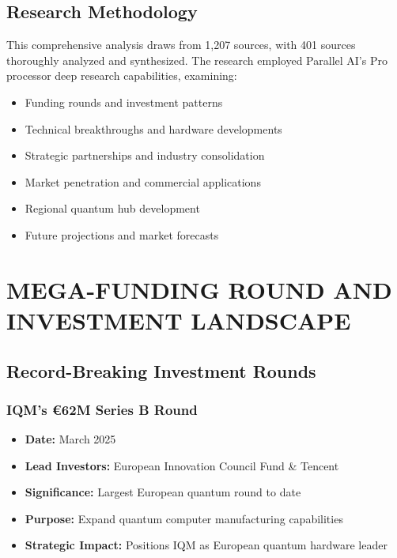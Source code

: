 \documentclass[12pt,a4paper]{article}
\begin{document}
\subsection{Research Methodology}

This comprehensive analysis draws from 1,207 sources, with 401 sources thoroughly analyzed and synthesized. The research employed Parallel AI's Pro processor deep research capabilities, examining:
\begin{itemize}
    \item Funding rounds and investment patterns
    \item Technical breakthroughs and hardware developments
    \item Strategic partnerships and industry consolidation
    \item Market penetration and commercial applications
    \item Regional quantum hub development
    \item Future projections and market forecasts
\end{itemize}

\section{MEGA-FUNDING ROUND AND INVESTMENT LANDSCAPE}

\subsection{Record-Breaking Investment Rounds}

\subsubsection{IQM's €62M Series B Round}
\begin{itemize}
    \item \textbf{Date:} March 2025
    \item \textbf{Lead Investors:} European Innovation Council Fund \& Tencent
    \item \textbf{Significance:} Largest European quantum round to date
    \item \textbf{Purpose:} Expand quantum computer manufacturing capabilities
    \item \textbf{Strategic Impact:} Positions IQM as European quantum hardware leader
\end{itemize}
\end{document}
